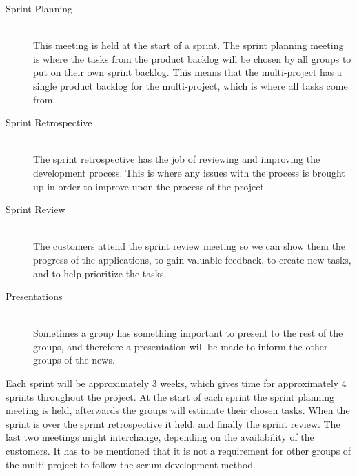 \begin{description}
	\item[Sprint Planning] \hfill \\
	This meeting is held at the start of a sprint.
	The sprint planning meeting is where the tasks from the product backlog will be chosen by all groups to put on their own sprint backlog.
	This means that the multi-project has a single product backlog for the multi-project, which is where all tasks come from.
	\item[Sprint Retrospective] \hfill \\
	The sprint retrospective has the job of reviewing and improving the development process. 
	This is where any issues with the process is brought up in order to improve upon the process of the project.
	\item[Sprint Review] \hfill \\
	The customers attend the sprint review meeting so we can show them the progress of the applications, to gain valuable feedback, to create new tasks, and to help prioritize the tasks. 
	\item[Presentations] \hfill \\
	Sometimes a group has something important to present to the rest of the groups, and therefore a presentation will be made to inform the other groups of the news.
\end{description}

Each sprint will be approximately 3 weeks, which gives time for approximately 4 sprints throughout the project.
At the start of each sprint the sprint planning meeting is held, afterwards the groups will estimate their chosen tasks.
When the sprint is over the sprint retrospective it held, and finally the sprint review.
The last two meetings might interchange, depending on the availability of the customers.
It has to be mentioned that it is not a requirement for other groups of the multi-project to follow the scrum development method.

